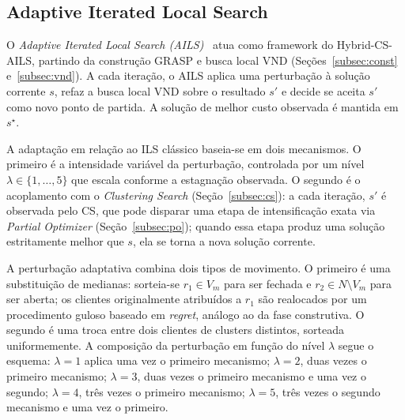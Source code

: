 \documentclass[a4paper,11pt]{article}
\begin{document}


\subsection{Adaptive Iterated Local Search}
\label{subsec:ils}

O \textit{Adaptive Iterated Local Search (AILS)}~\cite{lourenco2003iterated} atua como framework do Hybrid-CS-AILS, partindo da construção GRASP e busca local VND (Seções~\ref{subsec:const} e~\ref{subsec:vnd}). A cada iteração, o AILS aplica uma perturbação à solução corrente $s$, refaz a busca local VND sobre o resultado $s'$ e decide se aceita $s'$ como novo ponto de partida. A solução de melhor custo observada é mantida em $s^{\star}$.

A adaptação em relação ao ILS clássico baseia-se em dois mecanismos. O primeiro é a intensidade variável da perturbação, controlada por um nível $\lambda \in \{1, \ldots, 5\}$ que escala conforme a estagnação observada. O segundo é o acoplamento com o \textit{Clustering Search} (Seção~\ref{subsec:cs}): a cada iteração, $s'$ é observada pelo CS, que pode disparar uma etapa de intensificação exata via \textit{Partial Optimizer} (Seção~\ref{subsec:po}); quando essa etapa produz uma solução estritamente melhor que $s$, ela se torna a nova solução corrente. 

A perturbação adaptativa combina dois tipos de movimento. O primeiro é uma substituição de medianas: sorteia-se $r_1 \in V_m$ para ser fechada e $r_2 \in N \setminus V_m$ para ser aberta; os clientes originalmente atribuídos a $r_1$ são realocados por um procedimento guloso baseado em \textit{regret}, análogo ao da fase construtiva. O segundo é uma troca entre dois clientes de clusters distintos, sorteada uniformemente. A composição da perturbação em função do nível $\lambda$ segue o esquema: $\lambda{=}1$ aplica uma vez o primeiro mecanismo; $\lambda{=}2$, duas vezes o primeiro mecanismo; $\lambda{=}3$, duas vezes o primeiro mecanismo e uma vez o segundo; $\lambda{=}4$, três vezes o primeiro mecanismo; $\lambda{=}5$, três vezes o segundo mecanismo e uma vez o primeiro. 
\end{document}
